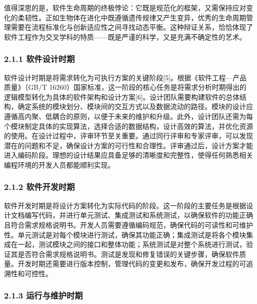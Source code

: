 值得深思的是，软件生命周期的终极悖论：它既是规范化的框架，又需保持应对变化的柔韧性。正如生物体在进化中既遵循遗传规律又产生变异，优秀的生命周期管理需要在流程标准化与创新适应性之间寻找动态平衡。这种辩证关系，恰恰体现了软件工程作为交叉学科的特质------既是严谨的科学，又是充满不确定性的艺术。 \subsubsection{2.1.1 软件设计时期}\label{ux8f6fux4ef6ux8bbeux8ba1ux65f6ux671f} 软件设计时期是将需求转化为可执行方案的关键阶段{[}5{]}。根据《软件工程---产品质量》（GB/T 16260）国家标准，这一阶段的核心任务是将需求分析时期得出的逻辑模型转化为具体的软件架构和设计方案{[}6{]}。设计团队需要构建软件的总体结构，确定系统的模块划分、模块间的交互方式以及数据流动的路径。模块的设计应遵循高内聚、低耦合的原则，以便于未来的维护和升级。此外，设计团队还需为每个模块制定具体的实现算法，选择合适的数据结构，设计高效的算法，并优化资源的使用。在设计过程中，评审环节至关重要。通过同行评审和专家评审，可以发现潜在的问题和不足，确保设计方案的可行性和合理性。评审通过后，设计方案才能进入编码阶段。理想的设计结果应具备足够的清晰度和完整性，使得任何熟悉相关编程环境的开发人员都能顺利实现。 \subsubsection{2.1.2 软件开发时期}\label{ux8f6fux4ef6ux5f00ux53d1ux65f6ux671f} 软件开发时期是将设计方案转化为实际代码的阶段。这一阶段的主要任务是根据设计文档编写代码，并进行单元测试、集成测试和系统测试，以确保软件的功能正确且符合需求规格说明书。开发人员需要遵循编码规范，确保代码的可读性和可维护性。单元测试是对每个模块进行测试，确保其功能正确；集成测试是将各个模块集成在一起，测试模块之间的接口和整体功能；系统测试是对整个系统进行测试，验证其是否符合需求规格说明书。测试是发现和修复错误的关键步骤，确保软件质量。开发时期还需要进行版本控制，管理代码的变更和发布，确保开发过程的可追溯性和可控性。 \subsubsection{2.1.3 运行与维护时期}\label{ux8fd0ux884cux4e0eux7ef4ux62a4ux65f6ux671f} 